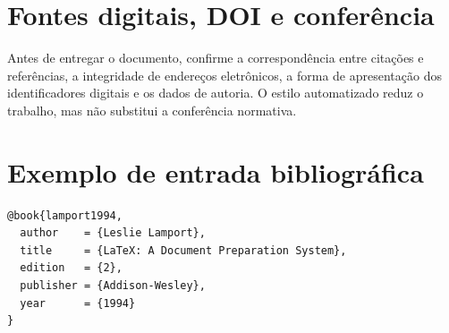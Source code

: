 \section{Fontes digitais, DOI e conferência}
Antes de entregar o documento, confirme a correspondência entre citações e referências, a integridade de endereços eletrônicos, a forma de apresentação dos identificadores digitais e os dados de autoria. O estilo automatizado reduz o trabalho, mas não substitui a conferência normativa.

\section{Exemplo de entrada bibliográfica}
\begin{verbatim}
@book{lamport1994,
  author    = {Leslie Lamport},
  title     = {LaTeX: A Document Preparation System},
  edition   = {2},
  publisher = {Addison-Wesley},
  year      = {1994}
}
\end{verbatim}
